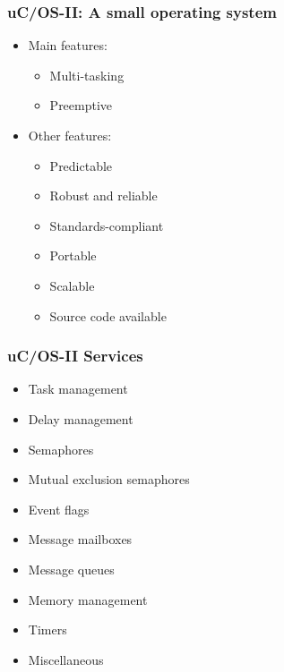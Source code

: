 \documentclass[hyperref={pdfpagelabels=false},svgnames]{beamer}
\begin{document}
\begin{frame}
\frametitle{uC/OS-II: A small operating system}
\begin{itemize}
\item Main features:
\begin{itemize}
\item Multi-tasking
\item Preemptive
\end{itemize}
\item Other features:
\begin{itemize}
\item Predictable
\item Robust and reliable
\item Standards-compliant
\item Portable
\item Scalable
\item Source code available
\end{itemize}
\end{itemize}
\end{frame}

\begin{frame}
\frametitle{uC/OS-II Services}
\begin{itemize}
\item<1-> Task management
\item<1-> Delay management
\item<2-> Semaphores
\item<2-> Mutual exclusion semaphores
\item<2-> Event flags
\item<2-> Message mailboxes
\item<2-> Message queues
\item<2-> Memory management
\item<2-> Timers
\item<2-> Miscellaneous
\end{itemize}

\end{frame}
\end{document}
